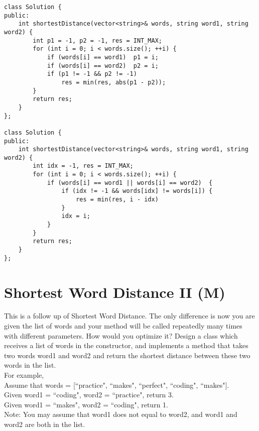\begin{lstlisting}
class Solution {
public:
    int shortestDistance(vector<string>& words, string word1, string word2) {
        int p1 = -1, p2 = -1, res = INT_MAX;
        for (int i = 0; i < words.size(); ++i) {
            if (words[i] == word1)  p1 = i;
            if (words[i] == word2)  p2 = i;
            if (p1 != -1 && p2 != -1)
                res = min(res, abs(p1 - p2));
        }
        return res;
    }
};

class Solution {
public:
    int shortestDistance(vector<string>& words, string word1, string word2) {
        int idx = -1, res = INT_MAX;
        for (int i = 0; i < words.size(); ++i) {
            if (words[i] == word1 || words[i] == word2)  {
                if (idx != -1 && words[idx] != words[i]) {
                    res = min(res, i - idx)
                }
                idx = i;
            }
        }
        return res;
    }
};
\end{lstlisting}


\section{Shortest Word Distance II (M)}
This is a follow up of Shortest Word Distance. The only difference is now you are given the list of words and your method will be called repeatedly many times with different parameters. How would you optimize it? Design a class which receives a list of words in the constructor, and implements a method that takes two words word1 and word2 and return the shortest distance between these two words in the list.\\

For example,\\
Assume that words = [``practice", ``makes", ``perfect", ``coding", ``makes"].\\
Given word1 = ``coding", word2 = ``practice", return 3.\\
Given word1 = ``makes", word2 = ``coding", return 1.\\

Note: You may assume that word1 does not equal to word2, and word1 and word2 are both in the list.\\

